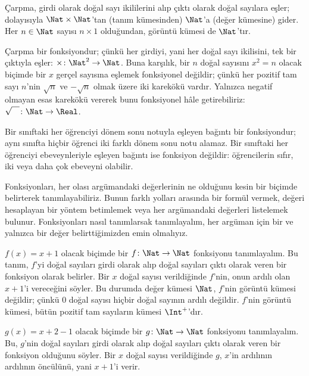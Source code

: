\begin{ex}
Çarpma, girdi olarak doğal sayı ikililerini alıp çıktı olarak doğal sayılara
eşler; dolayısıyla $\Nat \times \Nat$'tan (tanım kümesinden) $\Nat$'a (değer
kümesine) gider. Her $n \in \Nat$ sayısı $n \times 1$ olduğundan, görüntü
kümesi de $\Nat$'tır.
\end{ex}

\begin{ex}
Çarpma bir fonksiyondur; çünkü her girdiyi, yani her doğal sayı ikilisini,
tek bir çıktıyla eşler: $\times \colon \Nat^2 \to \Nat$. Buna karşılık, bir
$n$ doğal sayısını $x^2=n$ olacak biçimde bir $x$ gerçel sayısına eşlemek
fonksiyonel değildir; çünkü her pozitif tam sayı $n$'nin $\sqrt{n}$ ve
$-\sqrt{n}$ olmak üzere iki karekökü vardır. Yalnızca negatif olmayan esas
karekökü vererek bunu fonksiyonel hâle getirebiliriz:
$\sqrt{\phantom{X}} \colon \Nat \to \Real$.
\end{ex}

\begin{ex}
Bir sınıftaki her öğrenciyi dönem sonu notuyla eşleyen bağıntı bir
fonksiyondur; aynı sınıfta hiçbir öğrenci iki farklı dönem sonu notu alamaz.
Bir sınıftaki her öğrenciyi ebeveynleriyle eşleyen bağıntı ise fonksiyon
değildir: öğrencilerin sıfır, iki veya daha çok ebeveyni olabilir.
\end{ex}

\begin{explain}
Fonksiyonları, her olası argümandaki değerlerinin ne olduğunu kesin bir
biçimde belirterek tanımlayabiliriz. Bunun farklı yolları arasında bir formül
vermek, değeri hesaplayan bir yöntem betimlemek veya her argümandaki değerleri
listelemek bulunur. Fonksiyonları nasıl tanımlarsak tanımlayalım, her argüman
için bir ve yalnızca bir değer belirttiğimizden emin olmalıyız.
\end{explain}


\begin{ex}
$f(x)=x+1$ olacak biçimde bir $f \colon \Nat \to \Nat$ fonksiyonu
tanımlayalım. Bu tanım, $f$'yi doğal sayıları girdi olarak alıp doğal sayıları
çıktı olarak veren bir fonksiyon olarak belirler. Bir $x$ doğal sayısı
verildiğinde $f$'nin, onun ardılı olan $x+1$'i vereceğini söyler.
Bu durumda değer kümesi $\Nat$, $f$'nin görüntü kümesi değildir; çünkü $0$
doğal sayısı hiçbir doğal sayının ardılı değildir. $f$'nin görüntü kümesi,
bütün pozitif tam sayıların kümesi $\Int^{+}$'dır.
\end{ex}

\begin{ex}
$g(x)=x+2-1$ olacak biçimde bir $g \colon \Nat \to \Nat$ fonksiyonu
tanımlayalım. Bu, $g$'nin doğal sayıları girdi olarak alıp doğal sayıları
çıktı olarak veren bir fonksiyon olduğunu söyler. Bir $x$ doğal sayısı
verildiğinde $g$, $x$'in ardılının ardılının öncülünü, yani $x+1$'i verir.
\end{ex}

